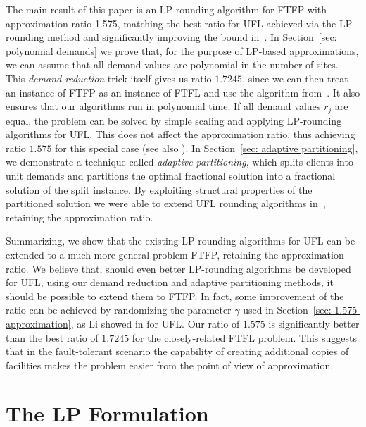 \documentclass{llncs}
\begin{document}
\smallskip

The main result of this paper is an LP-rounding algorithm for FTFP
with approximation ratio 1.575, matching the best ratio for UFL
achieved via the LP-rounding method \cite{ByrkaGS10} and significantly
improving the bound in~\cite{YanC11}. In Section~\ref{sec: polynomial
  demands} we prove that, for the purpose of LP-based approximations,
we can assume that all demand values are polynomial in the number of
sites. This \emph{demand reduction} trick itself gives us ratio
$1.7245$, since we can then treat an instance of FTFP as an instance
of FTFL and use the algorithm from~\cite{ByrkaSS10}. It also ensures
that our algorithms run in polynomial time. If all demand values $r_j$
are equal, the problem can be solved by simple scaling and applying
LP-rounding algorithms for UFL. This does not affect the approximation
ratio, thus achieving ratio $1.575$ for this special case (see also
\cite{LiaoShen11}). In Section~\ref{sec: adaptive partitioning}, we
demonstrate a technique called \emph{adaptive partitioning}, which
splits clients into unit demands and partitions the optimal fractional
solution into a fractional solution of the split instance. By
exploiting structural properties of the partitioned solution we were
able to extend UFL rounding algorithms
in~\cite{gupta08,ChudakS04,ByrkaGS10}, retaining the approximation
ratio.

Summarizing, we show that the existing LP-rounding
algorithms for UFL can be extended to a much more general
problem FTFP, retaining the approximation ratio. We believe
that, should even better LP-rounding algorithms be developed
for UFL, using our demand reduction and
adaptive partitioning methods, it should be possible to
extend them to FTFP.  In fact, some improvement of the ratio
can be achieved by randomizing the parameter
$\gamma$ used in Section~\ref{sec: 1.575-approximation}, as Li showed in \cite{Li11}
for UFL.  Our ratio of $1.575$ is significantly better
than the best ratio of $1.7245$ for the closely-related FTFL
problem. This suggests that in the fault-tolerant scenario
the capability of creating additional copies of facilities
makes the problem easier from the point of view of
approximation.


\section{The LP Formulation}\label{sec: the lp formulation}
\end{document}
